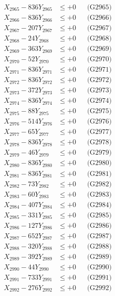 \documentclass[a4paper,10pt]{article}
\begin{document}
{\begin{align}
X_{2965} - 836Y_{2965} &\leq +0 && \text{(G2965)} \\
X_{2966} - 836Y_{2966} &\leq +0 && \text{(G2966)} \\
X_{2967} - 207Y_{2967} &\leq +0 && \text{(G2967)} \\
X_{2968} - 24Y_{2968} &\leq +0 && \text{(G2968)} \\
X_{2969} - 363Y_{2969} &\leq +0 && \text{(G2969)} \\
X_{2970} - 52Y_{2970} &\leq +0 && \text{(G2970)} \\
\allowbreak
X_{2971} - 836Y_{2971} &\leq +0 && \text{(G2971)} \\
X_{2972} - 836Y_{2972} &\leq +0 && \text{(G2972)} \\
X_{2973} - 372Y_{2973} &\leq +0 && \text{(G2973)} \\
X_{2974} - 836Y_{2974} &\leq +0 && \text{(G2974)} \\
X_{2975} - 88Y_{2975} &\leq +0 && \text{(G2975)} \\
X_{2976} - 514Y_{2976} &\leq +0 && \text{(G2976)} \\
X_{2977} - 65Y_{2977} &\leq +0 && \text{(G2977)} \\
X_{2978} - 836Y_{2978} &\leq +0 && \text{(G2978)} \\
X_{2979} - 46Y_{2979} &\leq +0 && \text{(G2979)} \\
X_{2980} - 836Y_{2980} &\leq +0 && \text{(G2980)} \\
\allowbreak
X_{2981} - 836Y_{2981} &\leq +0 && \text{(G2981)} \\
X_{2982} - 73Y_{2982} &\leq +0 && \text{(G2982)} \\
X_{2983} - 60Y_{2983} &\leq +0 && \text{(G2983)} \\
X_{2984} - 407Y_{2984} &\leq +0 && \text{(G2984)} \\
X_{2985} - 331Y_{2985} &\leq +0 && \text{(G2985)} \\
X_{2986} - 127Y_{2986} &\leq +0 && \text{(G2986)} \\
X_{2987} - 652Y_{2987} &\leq +0 && \text{(G2987)} \\
X_{2988} - 320Y_{2988} &\leq +0 && \text{(G2988)} \\
X_{2989} - 392Y_{2989} &\leq +0 && \text{(G2989)} \\
X_{2990} - 44Y_{2990} &\leq +0 && \text{(G2990)} \\
\allowbreak
X_{2991} - 733Y_{2991} &\leq +0 && \text{(G2991)} \\
X_{2992} - 276Y_{2992} &\leq +0 && \text{(G2992)} \\

\end{align}}
\end{document}

